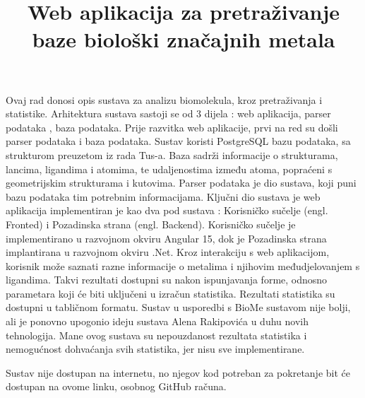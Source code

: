 \documentclass[times, utf8, zavrsni]{fer}
\begin{document}
\title{Web aplikacija za pretraživanje baze biološki značajnih metala}
\begin{sazetak}

Ovaj rad donosi opis sustava za analizu biomolekula, kroz pretraživanja i statistike.
Arhitektura sustava sastoji se od 3 dijela :  web aplikacija, parser podataka , baza podataka.
Prije razvitka web aplikacije, prvi na red su došli parser podataka i baza podataka.
Sustav koristi PostgreSQL bazu podataka, sa strukturom preuzetom iz rada Tus-a. Baza sadrži informacije o strukturama, lancima, ligandima i atomima, te udaljenostima između atoma, popraćeni s geometrijskim strukturama i kutovima.
Parser podataka je dio sustava, koji puni bazu podataka tim potrebnim informacijama.
Ključni dio sustava je web aplikacija  implementiran je kao dva pod sustava : Korisničko sučelje (engl. Fronted) i Pozadinska strana (engl. Backend).
Korisničko sučelje je implementirano u razvojnom okviru Angular 15, dok je Pozadinska strana implantirana u razvojnom okviru .Net. 
Kroz interakciju s web aplikacijom, korisnik može saznati razne informacije o metalima i njihovim međudjelovanjem s ligandima.
Takvi rezultati dostupni su nakon ispunjavanja forme, odnosno parametara koji će biti uključeni u izračun statistika.
Rezultati statistika su dostupni u tabličnom formatu.
Sustav u usporedbi s BioMe sustavom nije bolji, ali je ponovno upogonio ideju sustava Alena Rakipovića u duhu novih tehnologija.
Mane ovog sustava su nepouzdanost rezultata statistika i nemogućnost dohvaćanja svih statistika, jer nisu sve implementirane.

Sustav nije dostupan na internetu, no njegov kod potreban za pokretanje bit će dostupan na ovome linku, osobnog GitHub računa.

\end{sazetak}
\end{document}
